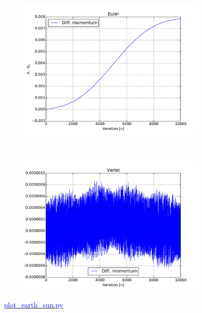 \begin{figure}[H]
    \centering
    \begin{subfigure}{0.5\textwidth}
        \centering
        \includegraphics[width=\linewidth]{result/bilder/momentum-euler.pdf}
    	\caption{}
    \end{subfigure}%
    ~ 
    \begin{subfigure}{0.5\textwidth}
        \centering
        \includegraphics[width=\linewidth]{result/bilder/momentum-verlet.pdf}
        \caption{}
    \end{subfigure}
    \caption{\href{https://github.com/erikfsk/Project-3/blob/master/Project3/3a/plot_earth_sun.py}{\textcolor{blue}{plot\_earth\_sun.py}}}
    \label{fig:conserved-momentum}
\end{figure}

















